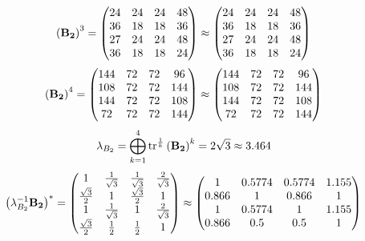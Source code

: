 \documentclass[10pt,a4paper]{article}
\begin{document}
	\[
		\left(\bold{B_2}\right)^{3} = 
		\begin{pmatrix}
			{{24}} {} & {{24}} {} & {{24}} {} & {{48}} {} \\
			{{36}} {} & {{18}} {} & {{18}} {} & {{36}} {} \\
			{{27}} {} & {{24}} {} & {{24}} {} & {{48}} {} \\
			{{36}} {} & {{18}} {} & {{18}} {} & {{24}} {} \\
		\end{pmatrix}
		\approx
		\begin{pmatrix}
			24       & 24       & 24       & 48       \\
			36       & 18       & 18       & 36       \\
			27       & 24       & 24       & 48       \\
			36       & 18       & 18       & 24       \\
		\end{pmatrix}
	\]
	\[
		\left(\bold{B_2}\right)^{4} = 
		\begin{pmatrix}
			{{144}} {} & {{72}} {} & {{72}} {} & {{96}} {} \\
			{{108}} {} & {{72}} {} & {{72}} {} & {{144}} {} \\
			{{144}} {} & {{72}} {} & {{72}} {} & {{108}} {} \\
			{{72}} {} & {{72}} {} & {{72}} {} & {{144}} {} \\
		\end{pmatrix}
		\approx
		\begin{pmatrix}
			144      & 72       & 72       & 96       \\
			108      & 72       & 72       & 144      \\
			144      & 72       & 72       & 108      \\
			72       & 72       & 72       & 144      \\
		\end{pmatrix}
	\]
	\[
		\lambda_{B_2} =  \bigoplus ^{4} _{k = 1} \operatorname{tr} ^{\frac 1 k} \left( \bold{B_2} \right)^k = {{2}\sqrt{3}} {}\approx 3.464
	\]
	\[
		\left(\lambda_{B_2}^{-1}\bold{B_2}\right)^* = 
		\begin{pmatrix}
			{1} {} & \frac{1} {\sqrt{3}} & \frac{1} {\sqrt{3}} & \frac{{2}} {\sqrt{3}} \\
			\frac{\sqrt{3}} {{2}} & {1} {} & \frac{\sqrt{3}} {{2}} & {1} {} \\
			{1} {} & \frac{1} {\sqrt{3}} & {1} {} & \frac{{2}} {\sqrt{3}} \\
			\frac{\sqrt{3}} {{2}} & \frac{1} {{2}} & \frac{1} {{2}} & {1} {} \\
		\end{pmatrix}
		\approx
		\begin{pmatrix}
			1        & 0.5774   & 0.5774   & 1.155    \\
			0.866    & 1        & 0.866    & 1        \\
			1        & 0.5774   & 1        & 1.155    \\
			0.866    & 0.5      & 0.5      & 1        \\
		\end{pmatrix}
	\]
\end{document}
